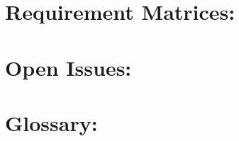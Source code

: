 \documentclass[12pt]{article}
\begin{document}
	\newpage
	\section{Requirement Matrices:}
	\vspace{0.2in}
	
	
	
	\vspace{0.5in}
	
	\section{Open Issues:}
	\vspace{0.2in}
	
	
	
	\vspace{0.5in}
	
	\section{Glossary:}
	\vspace{0.2in}
		
	
	\vspace{0.5in}
		
\end{document}
